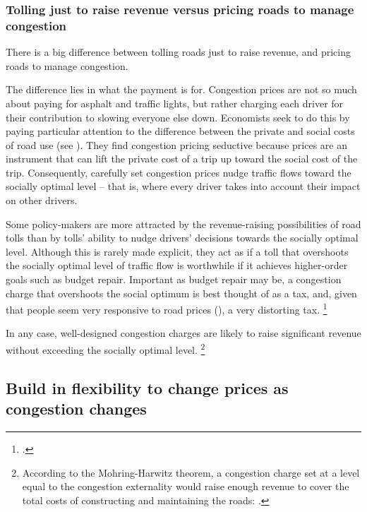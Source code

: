 \documentclass{grattan}
\begin{document}
\subsubsection{Tolling just to raise revenue versus pricing roads to manage congestion}

There is a big difference between tolling roads just to raise revenue, and pricing roads to manage congestion.

The difference lies in what the payment is for.
Congestion prices are not so much about paying for asphalt and traffic lights, but rather charging each driver for their contribution to slowing everyone else down.
Economists seek to do this by paying particular attention to the difference between the private and social costs of road use (see ).
They find congestion pricing seductive because prices are an instrument that can lift the private cost of a trip up toward the social cost of the trip.
Consequently, carefully set congestion prices nudge traffic flows toward the socially optimal level -- that is, where every driver takes into account their impact on other drivers.

Some policy-makers are more attracted by the revenue-raising possibilities of road tolls than by tolls' ability to nudge drivers' decisions towards the socially optimal level.
Although this is rarely made explicit, they act as if a toll that overshoots the socially optimal level of traffic flow is worthwhile if it achieves higher-order goals such as budget repair.
Important as budget repair may be, a congestion charge that overshoots the social optimum is best thought of as a tax, and, given that people seem very responsive to road prices (), a very distorting tax.
\footcites[][17]{HenryTaxReview2010}{KPMGEcontech2010-CGE-Analysis-of-Current-Aust-Tax-System}

In any case, well-designed congestion charges are likely to raise significant revenue without exceeding the socially optimal level.%
\footnote{According to the Mohring-Harwitz theorem, a congestion charge set at a level equal to the congestion externality would raise enough revenue to cover the total costs of constructing and maintaining the roads: \textcite{2007-Mohring-Harwitz-theorem}.} %

\subsection{Build in flexibility to change prices as congestion changes}
\end{document}
